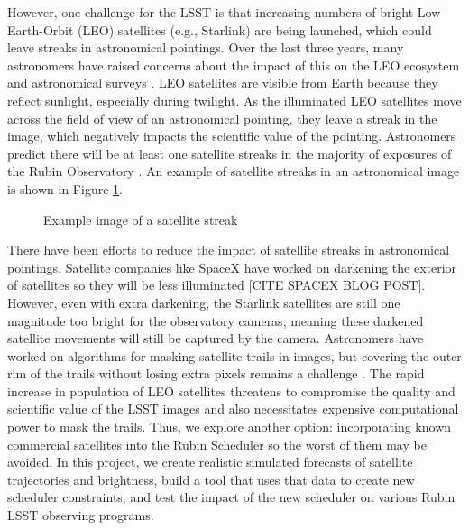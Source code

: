 \documentclass[linenumbers]{aastex631}
\begin{document}
However, one challenge for the LSST is that increasing numbers of bright
Low-Earth-Orbit (LEO) satellites (e.g., Starlink) are being launched, which could leave streaks
in astronomical pointings. Over the last three years, many astronomers have raised concerns
about the impact of this on the LEO ecosystem and astronomical surveys \citep{lawrence22,tyson20}. LEO satellites
are visible from Earth because they reflect sunlight, especially during twilight. As the
illuminated LEO satellites move across the field of view of an astronomical pointing, they leave
a streak in the image, which negatively impacts the scientific value of the pointing. Astronomers
predict there will be at least one satellite streaks in the majority of exposures of the Rubin
Observatory \citep{lawrence22}. %
An example of satellite streaks in an astronomical image is shown in Figure \ref{fig-streaks}.

\begin{figure}[ht!]
\caption{Example image of a satellite streak \label{fig-streaks}}
\end{figure}

There have been efforts to reduce the impact of satellite streaks in astronomical pointings.
Satellite companies like SpaceX have worked on darkening the exterior of satellites so they will
be less illuminated [CITE SPACEX BLOG POST]. However, even with extra darkening, the Starlink satellites are still one
magnitude too bright for the observatory cameras, meaning these darkened satellite movements
will still be captured by the camera. Astronomers have worked on algorithms for masking
satellite trails in images, but covering the outer rim of the trails without losing extra pixels
remains a challenge \citep{tyson20}.
The rapid increase in population of LEO satellites threatens to compromise the quality
and scientific value of the LSST images and also necessitates expensive computational power to
mask the trails. Thus, we explore another option: incorporating known commercial satellites into
the Rubin Scheduler so the worst of them may be avoided. In this project, we create realistic
simulated forecasts of satellite trajectories and brightness, build a tool that uses that data to create
new scheduler constraints, and test the impact of the new scheduler on various Rubin LSST
observing programs.
\end{document}
